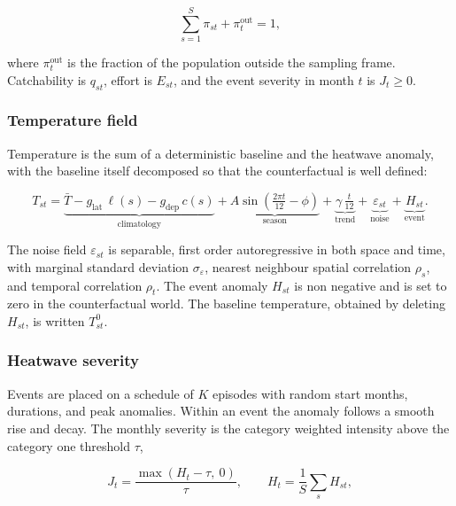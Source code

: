 \documentclass[
  11pt,
  a4paper,
]{article}
\begin{document}
\begin{equation}
\sum_{s=1}^{S} \pi_{st} + \pi^{\text{out}}_t = 1,
\end{equation}

\noindent where \(\pi^{\text{out}}_t\) is the fraction of the population outside
the sampling frame. Catchability is \(q_{st}\), effort is \(E_{st}\),
and the event severity in month \(t\) is \(J_t \ge 0\).

\hypertarget{temperature-field}{%
\subsubsection{Temperature field}\label{temperature-field}}

Temperature is the sum of a deterministic baseline and the heatwave
anomaly, with the baseline itself decomposed so that the counterfactual
is well defined:

\begin{equation}
T_{st} = \underbrace{\bar{T} - g_{\text{lat}}\,\ell(s) - g_{\text{dep}}\,c(s)}_{\text{climatology}} + \underbrace{A\sin\!\left(\tfrac{2\pi t}{12} - \phi\right)}_{\text{season}} + \underbrace{\gamma\,\tfrac{t}{12}}_{\text{trend}} + \underbrace{\varepsilon_{st}}_{\text{noise}} + \underbrace{H_{st}}_{\text{event}} .
\end{equation}

\noindent The noise field \(\varepsilon_{st}\) is separable, first order
autoregressive in both space and time, with marginal standard deviation
\(\sigma_{\varepsilon}\), nearest neighbour spatial correlation
\(\rho_s\), and temporal correlation \(\rho_t\). The event anomaly
\(H_{st}\) is non negative and is set to zero in the counterfactual
world. The baseline temperature, obtained by deleting \(H_{st}\), is
written \(T^{0}_{st}\).

\hypertarget{heatwave-severity}{%
\subsubsection{Heatwave severity}\label{heatwave-severity}}

Events are placed on a schedule of \(K\) episodes with random start
months, durations, and peak anomalies. Within an event the anomaly
follows a smooth rise and decay. The monthly severity is the category
weighted intensity above the category one threshold \(\tau\),

\begin{equation}
J_t = \frac{\max\!\left(H_t - \tau,\ 0\right)}{\tau}, \qquad H_t = \frac{1}{S}\sum_{s} H_{st},
\end{equation}
\end{document}
